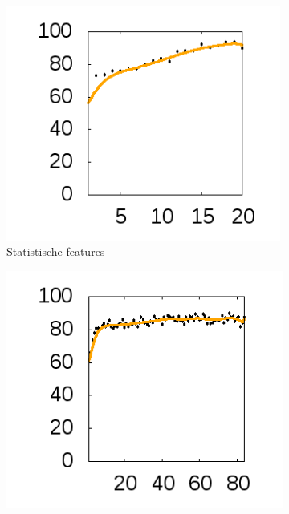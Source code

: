 \documentclass{article}
\begin{document}

\begin{figure}[htb]
\centering

  \begin{subfigure}[b]{.49\linewidth}
    \centering
    \includegraphics[width=0.99\textwidth]{figures/StatisticFeatures}
    \caption{Statistische features}\label{fig:1a}
  \end{subfigure}%
  \begin{subfigure}[b]{.49\linewidth}
    \centering
    \includegraphics[width=.99\textwidth]{figures/FFTFeatures}

\end{subfigure}
\end{figure}
\end{document}
